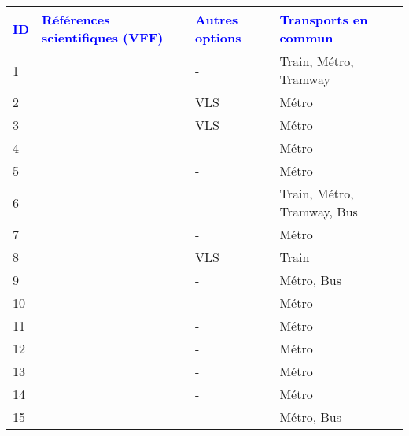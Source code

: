        \begin{longtable}{p{0.5cm}p{5.5cm}p{3cm}p{4cm}}
        \hline
        \small{\textcolor{blue}{\textbf{ID}}} & \small{\textcolor{blue}{\textbf{Références scientifiques (VFF)}}} & \small{\textcolor{blue}{\textbf{Autres options}}} & \small{\textcolor{blue}{\textbf{Transports en commun}}}\\
        \hline
        \endhead
    \small{1} & \small{\textcite{cai_system_2021}}\index{Cai, Jianming|pagebf} & \small{-} & \small{Train, Métro, Tramway}\\
    \small{2} & \small{\textcite{chen_what_2022}}\index{Chen, Wendong|pagebf} & \small{VLS} & \small{Métro}\\
    \small{3} & \small{\textcite{cheng_comparison_2023}}\index{Cheng, Long|pagebf} & \small{VLS} & \small{Métro}\\
    \small{4} & \small{\textcite{cheng_exploring_2022}}\index{Cheng, Long|pagebf} & \small{-} & \small{Métro}\\
    \small{5} & \small{\textcite{chu_last_2021}}\index{Chu, Junhong|pagebf} & \small{-} & \small{Métro}\\
    \small{6} & \small{\textcite{fan_how_2019}}\index{Fan, Aihua|pagebf} & \small{-} & \small{Train, Métro, Tramway, Bus}\\
    \small{7} & \small{\textcite{fan_dockless_2020}}\index{Fan, Yichun|pagebf} & \small{-} & \small{Métro}\\
    \small{8} & \small{\textcite{van_goeverden_potential_2018}}\index{van Goeverden, Kees|pagebf} & \small{VLS} & \small{Train}\\
    \small{9} & \small{\textcite{guo_exploring_2023}}\index{Guo, Dongbo|pagebf} & \small{-} & \small{Métro, Bus}\\
    \small{10} & \small{\textcite{guo_built_2020}}\index{Guo, Yuanyuan|pagebf} & \small{-} & \small{Métro}\\
    \small{11} & \small{\textcite{guo_role_2021}}\index{Guo, Yuanyuan|pagebf} & \small{-} & \small{Métro}\\
    \small{12} & \small{\textcite{guo_dockless_2021}}\index{Guo, Yuanyuan|pagebf} & \small{-} & \small{Métro}\\
    \small{13} & \small{\textcite{hu_study_2019}}\index{Hu, Li|pagebf} & \small{-} & \small{Métro}\\
    \small{14} & \small{\textcite{hu_examining_2022}}\index{Hu, Songhua|pagebf} & \small{-} & \small{Métro}\\
    \small{15} & \small{\textcite{jin_competition_2019}}\index{Jin, Haitao|pagebf} & \small{-} & \small{Métro, Bus}\\

\end{longtable}
